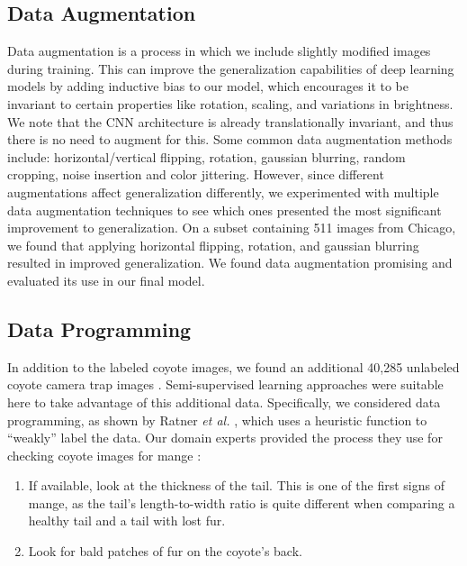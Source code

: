\documentclass{article}
\begin{document}
\subsection{Data Augmentation}
Data augmentation is a process in which we include slightly modified images during training. This can improve the generalization capabilities of deep learning models \cite{Shorten2019} by adding inductive bias to our model, which encourages it to be invariant to certain properties like rotation, scaling, and variations in brightness. 
We note that the CNN architecture is already translationally invariant, and thus there is no need to augment for this. 
Some common data augmentation methods include: horizontal/vertical flipping, rotation, gaussian blurring, random cropping, noise insertion and color jittering. However, since different augmentations affect generalization differently, we experimented with multiple data augmentation techniques to see which ones presented the most significant improvement to generalization. On a subset containing 511 images from Chicago, we found that applying horizontal flipping, rotation, and gaussian blurring resulted in improved generalization. We found data augmentation promising and evaluated its use in our final model.

\subsection{Data Programming} 
In addition to the labeled coyote images, we found an additional 40,285 unlabeled coyote camera trap images \cite{DBLP:BeeryHP18}. 
Semi-supervised learning approaches were suitable here to take advantage of this additional data. Specifically, we considered data programming, as shown by Ratner \textit{et al.} \cite{ratner2017data}, which uses a heuristic function 
to “weakly” label the data. 
Our domain experts provided the process they use for checking coyote images for mange \cite{C469Meeting}:
\begin{enumerate}
    \item If available, look at the thickness of the tail. This is one of the first signs of mange, as the tail's length-to-width ratio is quite different when comparing a healthy tail and a tail with lost fur.
    \item Look for bald patches of fur on the coyote’s back.
\end{enumerate}
\end{document}
